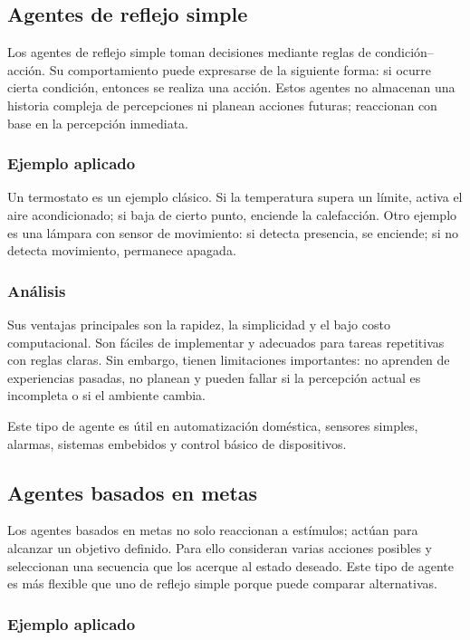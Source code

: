 \subsection{Agentes de reflejo simple}

Los agentes de reflejo simple toman decisiones mediante reglas de condición--acción. Su comportamiento puede expresarse de la siguiente forma: si ocurre cierta condición, entonces se realiza una acción. Estos agentes no almacenan una historia compleja de percepciones ni planean acciones futuras; reaccionan con base en la percepción inmediata.

\subsubsection{Ejemplo aplicado}

Un termostato es un ejemplo clásico. Si la temperatura supera un límite, activa el aire acondicionado; si baja de cierto punto, enciende la calefacción. Otro ejemplo es una lámpara con sensor de movimiento: si detecta presencia, se enciende; si no detecta movimiento, permanece apagada.

\subsubsection{Análisis}

Sus ventajas principales son la rapidez, la simplicidad y el bajo costo computacional. Son fáciles de implementar y adecuados para tareas repetitivas con reglas claras. Sin embargo, tienen limitaciones importantes: no aprenden de experiencias pasadas, no planean y pueden fallar si la percepción actual es incompleta o si el ambiente cambia.

Este tipo de agente es útil en automatización doméstica, sensores simples, alarmas, sistemas embebidos y control básico de dispositivos.

\subsection{Agentes basados en metas}

Los agentes basados en metas no solo reaccionan a estímulos; actúan para alcanzar un objetivo definido. Para ello consideran varias acciones posibles y seleccionan una secuencia que los acerque al estado deseado. Este tipo de agente es más flexible que uno de reflejo simple porque puede comparar alternativas.

\subsubsection{Ejemplo aplicado}

